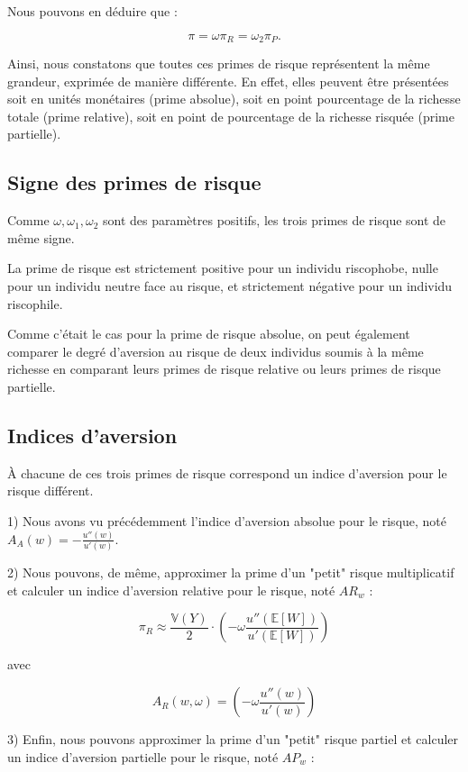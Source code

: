 \documentclass[a4paper, 12pt]{report}
\begin{document}
Nous pouvons en déduire que :

\[
\pi = \omega \pi_R = \omega_2 \pi_P.
\]

Ainsi, nous constatons que toutes ces primes de risque représentent la même grandeur, exprimée de manière différente. En effet, elles peuvent être présentées soit en unités monétaires (prime absolue), soit en point pourcentage de la richesse totale (prime relative), soit en point de pourcentage de la richesse risquée (prime partielle).

\subsection{Signe des primes de risque}

Comme \( \omega, \omega_1, \omega_2 \) sont des paramètres positifs, les trois primes de risque sont de même signe. 

La prime de risque est strictement positive pour un individu riscophobe, nulle pour un individu neutre face au risque, et strictement négative pour un individu riscophile.

Comme c'était le cas pour la prime de risque absolue, on peut également comparer le degré d'aversion au risque de deux individus soumis à la même richesse en comparant leurs primes de risque relative ou leurs primes de risque partielle.

\subsection{Indices d'aversion}

À chacune de ces trois primes de risque correspond un indice d'aversion pour le risque différent.

1) Nous avons vu précédemment l'indice d'aversion absolue pour le risque, noté \( A_A(w) = -\frac{u''(w)}{u'(w)} \).

2) Nous pouvons, de même, approximer la prime d'un "petit" risque multiplicatif et calculer un indice d'aversion relative pour le risque, noté \( AR_w \) :

\[
\pi_R \approx \frac{\mathbb{V}(Y)}{2} \cdot \left( -\omega\frac{ u''(\mathbb{E}[W])}{u'(\mathbb{E}[W])}\right) 
\]

avec 

\[
A_R(w,\omega) = \left( -\omega\frac{ u''(w)}{u'(w)}\right) 
\]

3) Enfin, nous pouvons approximer la prime d'un "petit" risque partiel et calculer un indice d'aversion partielle pour le risque, noté \( AP_w \) :
\end{document}
